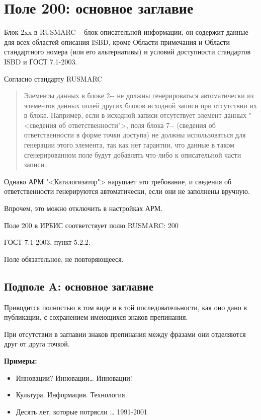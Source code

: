 \chapter{Поле 200: основное заглавие}

Блок 2xx в RUSMARC -- блок описательной информации, он содержит данные для всех областей описания ISBD, кроме Области примечания и Области стандартного номера (или его альтернативы) и условий доступности стандартов ISBD и ГОСТ 7.1-2003. 

Согласно стандарту RUSMARC

\begin{quotation}
	Элементы данных в блоке 2{-}{-} не должны генерироваться автоматически из элементов данных полей других блоков исходной записи при отсутствии их в блоке. Например, если в исходной записи отсутствует элемент данных "<сведения об ответственности">, поля блока 7{-}{-} (сведения об ответственности в форме точки доступа) не должны использоваться для генерации этого элемента, так как нет гарантии, что данные в таком сгенерированном поле будут добавлять что-либо к описательной части записи.
\end{quotation}

Однако АРМ "<Каталогизатор"> нарушает это требование, и сведения об ответственности генерируются автоматически, если они не заполнены вручную.

Впрочем, это можно отключить в настройках АРМ.

Поле 200 в ИРБИС соответствует полю RUSMARC: 200

ГОСТ 7.1-2003, пункт 5.2.2. %

Поле обязательное, не повторяющееся.

\section{Подполе A: основное заглавие}

Приводится полностью в том виде и в той последовательности, как оно дано в публикации, с сохранением имеющихся знаков препинания.

При отсутствии в заглавии знаков препинания между фразами они отделяются друг от друга точкой.

\textbf{Примеры:}

\vspace{-3mm}
\begin{itemize}
    \setlength\itemsep{-2mm}
	\item Инновации? Инновации… Инновации!
	\item Культура. Информация. Технология
	\item Десять лет, которые потрясли … 1991-2001
\end{itemize}

